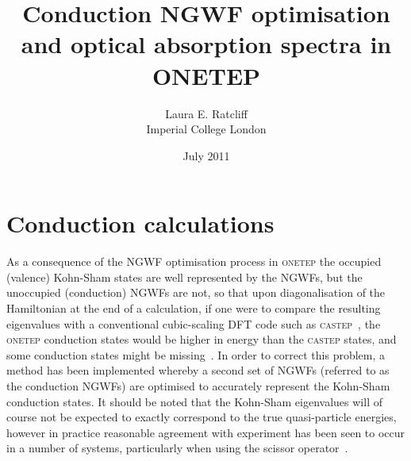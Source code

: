 \documentclass[a4paper,oneside,11pt]{article}
\begin{document}
\title{Conduction NGWF optimisation and optical absorption spectra in ONETEP}
\author{Laura E. Ratcliff \\  Imperial College London}
\date{July 2011}

\maketitle

\section*{Conduction calculations}

As a consequence of the NGWF optimisation process in \textsc{onetep} the occupied (valence) Kohn-Sham states are well represented by the NGWFs, but the unoccupied (conduction) NGWFs are not, so that upon diagonalisation of the Hamiltonian at the end of a calculation, if one were to compare the resulting eigenvalues with a conventional cubic-scaling DFT code such as \textsc{castep}~\cite{castep}, the \textsc{onetep} conduction states would be higher in energy than the \textsc{castep} states, and some conduction states might be missing~\cite{skylaris}.  In order to correct this problem, a method has been implemented whereby a second set of NGWFs (referred to as the conduction NGWFs) are optimised to accurately represent the Kohn-Sham conduction states.  It should be noted that the Kohn-Sham eigenvalues will of course not be expected to exactly correspond to the true quasi-particle energies, however in practice reasonable agreement with experiment has been seen to occur in a number of systems, particularly when using the scissor operator~\cite{godby,gygi}.
\end{document}
